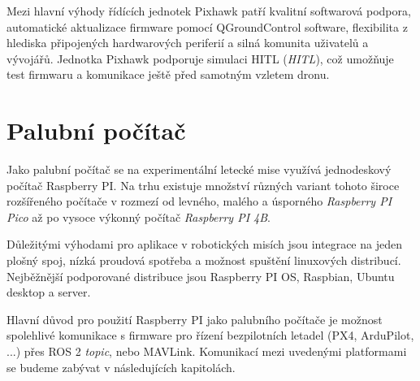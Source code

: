 Mezi hlavní výhody řídících jednotek Pixhawk patří kvalitní softwarová podpora, automatické aktualizace firmware pomocí QGroundControl software, flexibilita z hlediska připojených hardwarových periferií a silná komunita uživatelů a vývojářů. Jednotka Pixhawk podporuje simulaci \acs{HITL} (\textit{\acl{HITL}}), což umožňuje test firmwaru a komunikace ještě před samotným vzletem dronu.

\section{Palubní počítač}

Jako palubní počítač se na experimentální letecké mise využívá jednodeskový počítač Raspberry PI. Na trhu existuje množství různých variant tohoto široce rozšířeného počítače v rozmezí od levného, malého a úsporného  \textit{Raspberry PI Pico} až po vysoce výkonný počítač \textit{Raspberry PI 4B}.

Důležitými výhodami pro aplikace v robotických misích jsou integrace na jeden plošný spoj, nízká proudová spotřeba a možnost spuštění linuxových distribucí. Nejběžnější podporované distribuce jsou Raspberry PI OS, Raspbian, Ubuntu desktop a server.

Hlavní důvod pro použití Raspberry PI jako palubního počítače je možnost spolehlivé komunikace s firmware pro řízení bezpilotních letadel (PX4, ArduPilot, ...) přes ROS 2 \textit{topic}, nebo MAVLink. Komunikací mezi uvedenými platformami se budeme zabývat v následujících kapitolách.
